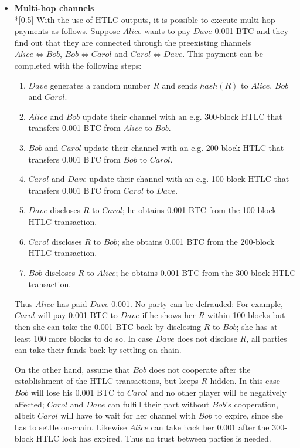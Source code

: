 \begin{itemize}
  \item \textbf{Multi-hop channels} \ \\*[0.5\baselineskip]
    With the use of HTLC outputs, it is possible to execute multi-hop payments as follows.
    Suppose $Alice$ wants to pay $Dave$ 0.001 BTC and they find out that they are
    connected through the preexisting channels $Alice \Leftrightarrow Bob$, $Bob
    \Leftrightarrow Carol$ and $Carol \Leftrightarrow Dave$. This payment can be completed
    with the following steps:
    \begin{enumerate}
      \item $Dave$ generates a random number $R$ and sends $hash\left(R\right)$ to
      $Alice$, $Bob$ and $Carol$.
      \item $Alice$ and $Bob$ update their channel with an e.g. 300-block HTLC that
      transfers 0.001 BTC from $Alice$ to $Bob$.
      \item $Bob$ and $Carol$ update their channel with an e.g. 200-block HTLC that
      transfers 0.001 BTC from $Bob$ to $Carol$.
      \item $Carol$ and $Dave$ update their channel with an e.g. 100-block HTLC that
      transfers 0.001 BTC from $Carol$ to $Dave$.
      \item $Dave$ discloses $R$ to $Carol$; he obtains 0.001 BTC from the 100-block HTLC
      transaction.
      \item $Carol$ discloses $R$ to $Bob$; she obtains 0.001 BTC from the 200-block HTLC
      transaction.
      \item $Bob$ discloses $R$ to $Alice$; he obtains 0.001 BTC from the 300-block HTLC
      transaction.
    \end{enumerate}
    Thus $Alice$ has paid $Dave$ 0.001. No party can be defrauded: For example, $Carol$
    will pay 0.001 BTC to $Dave$ if he shows her $R$ within 100 blocks but then she can
    take the 0.001 BTC back by disclosing $R$ to $Bob$; she has at least 100 more blocks
    to do so. In case $Dave$ does not disclose $R$, all parties can take their funds back
    by settling on-chain.

    On the other hand, assume that $Bob$ does not cooperate after the establishment of the
    HTLC transactions, but keeps $R$ hidden. In this case $Bob$ will lose his 0.001 BTC to
    $Carol$ and no other player will be negatively affected; $Carol$ and $Dave$ can
    fulfill their part without $Bob$'s cooperation, albeit $Carol$ will have to wait for
    her channel with $Bob$ to expire, since she has to settle on-chain. Likewise $Alice$
    can take back her 0.001 after the 300-block HTLC lock has expired. Thus no trust
    between parties is needed.


\end{itemize}
